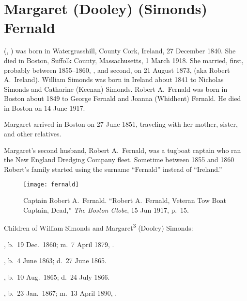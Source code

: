 \section{Margaret (Dooley) (Simonds) Fernald}

 (, ) was born in Watergrasshill, County Cork, Ireland, 27 December 1840.\cite{Margaret3DooleyBaptism} She died in Boston, Suffolk County, Massachusetts, 1 March 1918.\cite{Margaret3DooleyDeath} She married, first, probably between 1855--1860, ,\cite{WilliamSimondsMarriage} and second, on 21 August 1873, \cite{RobertFernaldMarriage} (aka Robert A.\ Ireland).\cite{Census1855RobertFernald} William Simonds was born in Ireland about 1841\cite{Census1855WilliamSimonds} to Nicholas Simonds and Catharine (Keenan) Simonds.\cite{WilliamSimondsDeath,CatharineSimondsDeath} Robert A.\ Fernald was born in Boston about 1849 to George Fernald and Joanna (Whidhent) Fernald.\cite{RobertFernaldMarriage,JoannaFernaldDeath} He died in Boston on 14 June 1917.\cite{RobertFernaldDeath}

Margaret arrived in Boston on 27 June 1851, traveling with her mother, sister, and other relatives.\cite{Chascay}

Margaret's second husband, Robert A.\ Fernald, was a tugboat captain who ran the New England Dredging Company fleet.\cite{RobertFernaldDeath} Sometime between 1855 and 1860 Robert's family started using the surname ``Fernald'' instead of ``Ireland.''\cite{Census1855RobertFernald,Census1860RobertFernald}

\begin{figure}
	\centering
	\texttt{[image: fernald]}
	\caption{Captain Robert A.\ Fernald. ``Robert A.\ Fernald, Veteran Tow Boat Captain, Dead,'' \textit{The Boston Globe}, 15 Jun 1917, p.\ 15.}
\end{figure}

\begin{KidsIntro}
	Children of William Simonds and Margaret\textsuperscript{3} (Dooley) Simonds:
\end{KidsIntro}

\begin{Kids}
	
	, b.\ 19 Dec.\ 1860; m.\ 7 April 1879, .
	
	, b.\ 4 June 1863;\cite{Francis4SimondsBirth} d.\ 27 June 1865.\cite{Francis4SimondsDeath}
	
	, b.\ 10 Aug.\ 1865;\cite{Margaret4SimondsBirth} d.\ 24 July 1866.\cite{Margaret4SimondsDeath}
	
	, b.\ 23 Jan.\ 1867; m.\ 13 April 1890, .

\end{Kids}
	
